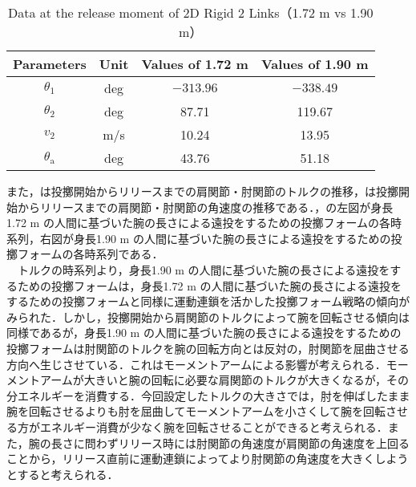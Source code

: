 \begin{table}[tb]
  \begin{center}
    \caption{Data at the release moment of 2D Rigid 2 Links（1.72 m vs 1.90 m）}
    \begin{tabular}{c|c|c|c}
      \hline
      Parameters & Unit & Values of 1.72 m & Values of 1.90 m \\
      \hline
      $\theta_{1}$ & deg & $-313.96$ & $-338.49$ \\
      $\theta_{2}$ & deg & 87.71 & 119.67 \\
      $v_{2}$ & m/s & 10.24 & 13.95 \\
      $\theta_{\mathrm{a}}$ & deg & 43.76 & 51.18 \\
      \hline
    \end{tabular}
  \end{center}
\end{table}

また，は投擲開始からリリースまでの肩関節・肘関節のトルクの推移，は投擲開始からリリースまでの肩関節・肘関節の角速度の推移である．，の左図が身長1.72 m の人間に基づいた腕の長さによる遠投をするための投擲フォームの各時系列，右図が身長1.90 m の人間に基づいた腕の長さによる遠投をするための投擲フォームの各時系列である．\\
　トルクの時系列より，身長1.90 m の人間に基づいた腕の長さによる遠投をするための投擲フォームは，身長1.72 m の人間に基づいた腕の長さによる遠投をするための投擲フォームと同様に運動連鎖を活かした投擲フォーム戦略の傾向がみられた．しかし，投擲開始から肩関節のトルクによって腕を回転させる傾向は同様であるが，身長1.90 m の人間に基づいた腕の長さによる遠投をするための投擲フォームは肘関節のトルクを腕の回転方向とは反対の，肘関節を屈曲させる方向へ生じさせている．これはモーメントアームによる影響が考えられる．モーメントアームが大きいと腕の回転に必要な肩関節のトルクが大きくなるが，その分エネルギーを消費する．今回設定したトルクの大きさでは，肘を伸ばしたまま腕を回転させるよりも肘を屈曲してモーメントアームを小さくして腕を回転させる方がエネルギー消費が少なく腕を回転させることができると考えられる．また，腕の長さに問わずリリース時には肘関節の角速度が肩関節の角速度を上回ることから，リリース直前に運動連鎖によってより肘関節の角速度を大きくしようとすると考えられる．

\clearpage
{}

